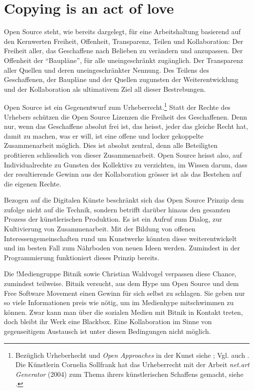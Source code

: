 \documentclass[
paper=164mm:234mm, %
pagesize, %
DIV=calc, %
10pt, %
parskip=half- %
]{scrbook}
\begin{document}
{}
\chapter*{Copying is an act of love}

Open Source steht, wie bereits dargelegt, für eine Arbeitshaltung basierend auf den Kernwerten Freiheit, Offenheit, Transparenz, Teilen und Kollaboration: Der Freiheit aller, das Geschaffene nach Belieben zu verändern und anzupassen. Der Offenheit der \enquote{Baupläne}, für alle uneingeschränkt zugänglich. Der Transparenz aller Quellen und deren uneingeschränkter Nennung. Des Teilens des Geschaffenen, der Baupläne und der Quellen zugunsten der Weiterentwicklung und der Kollaboration als ultimativem Ziel all dieser Bestrebungen.

Open Source ist ein Gegenentwurf zum Urheberrecht.\footnote{Bezüglich Urheberhecht und \emph{Open Approaches} in der Kunst siehe \cite{Senn:2007}; Vgl. auch \cite{Stalder:2010}. Die Künstlerin Cornelia Sollfrank hat das Urheberrecht mit der Arbeit \emph{net.art Generator} (2004) zum Thema ihrers künstlerischen Schaffens gemacht, siehe \cite{Sollfrank:2004}.} Statt der Rechte des Urhebers schützen die Open Source Lizenzen die Freiheit des Geschaffenen. Denn nur, wenn das Geschaffene absolut frei ist, das heisst, jeder das gleiche Recht hat, damit zu machen, was er will, ist eine offene und locker gekoppelte Zusammenarbeit möglich. Dies ist absolut zentral, denn alle Beteiligten profitieren schliesslich von dieser Zusammenarbeit. Open Source heisst also, auf Individualrechte zu Gunsten des Kollektivs zu verzichten, im Wissen darum, dass der resultierende Gewinn aus der Kollaboration grösser ist als das Bestehen auf die eigenen Rechte.

Bezogen auf die Digitalen Künste beschränkt sich das Open Source Prinzip dem zufolge nicht auf die Technik, sondern betrifft darüber hinaus den gesamten Prozess der künstlerischen Produktion. Es ist ein Aufruf zum Dialog, zur Kultivierung von Zusammenarbeit. Mit der Bildung von offenen Interessengemeinschaften rund um Kunstwerke könnten diese weiterentwickelt und im besten Fall zum Nährboden von neuen Ideen werden. Zumindest in der Programmierung funktioniert dieses Prinzip bereits.

Die !Mediengruppe Bitnik sowie Christian Waldvogel verpassen diese Chance, zumindest teilweise. Bitnik versucht, aus dem Hype um Open Source und dem Free Software Movement einen Gewinn für sich selbst zu schlagen. Sie geben nur so viele Informationen preis wie nötig, um im Medienhype mitschwimmen zu können. Zwar kann man über die sozialen Medien mit Bitnik in Kontakt treten, doch bleibt ihr Werk eine Blackbox. Eine Kollaboration im Sinne von gegenseitigem Austausch ist unter diesen Bedingungen nicht möglich.
\end{document}
